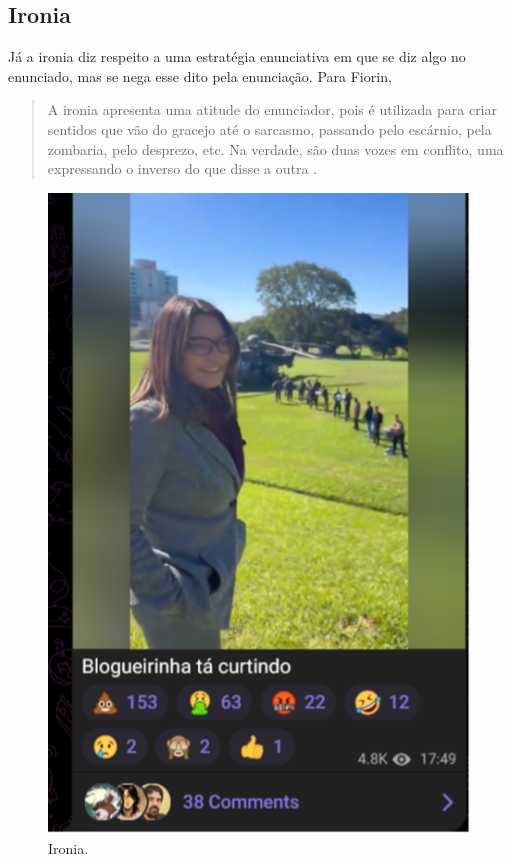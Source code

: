 \documentclass[portuguese]{textolivre}
\begin{document}
\subsection{Ironia}
Já a ironia diz respeito a uma estratégia enunciativa em que se diz algo no enunciado, mas se nega esse dito pela enunciação. Para Fiorin,

\begin{quote}
    A ironia apresenta uma atitude do enunciador, pois é utilizada para criar sentidos que vão do gracejo até o sarcasmo, passando pelo escárnio, pela zombaria, pelo desprezo, etc. Na verdade, são duas vozes em conflito, uma expressando o inverso do que disse a outra \cite[p. 70]{fiorin2014}.
\end{quote}

\begin{figure}[ht]
    \centering
    \begin{minipage}{.40\textwidth}
        \centering
        \includegraphics[width=\textwidth]{Imagens/Fig40.png}
        \caption{Ironia.}
        \label{fig-40}
    \end{minipage}
    \end{figure}
    
\end{document}
